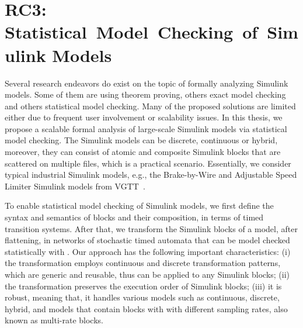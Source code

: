 \section[RC3: Statistical~Model~Checking~of~Simulink Models]{RC3: \\Statistical~Model~Checking~of~Simulink Models}\label{rc_sim}
Several research endeavors do exist on the topic of formally analyzing Simulink models. Some of them are using theorem proving, others exact model checking and others statistical model checking. Many of the proposed solutions are  limited either due to frequent user involvement or scalability issues. In this thesis, we propose a scalable formal analysis of large-scale Simulink models via statistical model checking. The Simulink models can be discrete, continuous or hybrid, moreover, they can consist of atomic and composite Simulink blocks that are scattered on multiple files, which is a practical scenario. Essentially, we consider typical industrial Simulink models, e.g., the Brake-by-Wire and Adjustable Speed Limiter Simulink models from VGTT~\cite{Filipovikj2018SimppaalModels}.

To enable statistical model checking of Simulink models, we first define the syntax and semantics of blocks and their composition, in terms of timed transition systems. After that, we transform the Simulink blocks of a model, after flattening, in networks of stochastic timed automata that can be model checked statistically with \uppaalsmc.  Our approach has the following important characteristics: (i) the transformation employs continuous and discrete transformation patterns, which are generic and reusable, thus can be applied to any Simulink blocks; (ii) the transformation preserves the execution order of Simulink blocks; (iii) it is robust, meaning that, it handles various models such as continuous, discrete, hybrid, and models that contain blocks with with different sampling rates, also known as multi-rate blocks.

